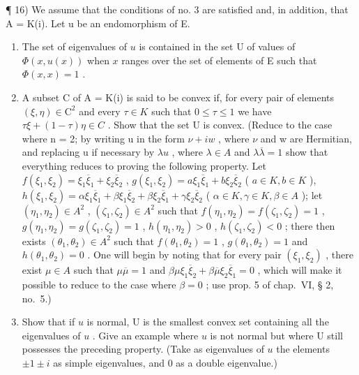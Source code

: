 ¶ 16) We assume that the conditions of no. 3 are satisfied and, in addition, that A = K(i). Let u be an endomorphism of E.

\begin{enumerate}
\def\labelenumi{\alph{enumi})}
\item
  The set of eigenvalues of \(u\) is contained in the set U of values of \(\Phi(x, u(x))\) when \(x\) ranges over the set of elements of E such that \(\Phi(x, x) = 1\) .
\item
  A subset C of A = K(i) is said to be convex if, for every pair of elements \((\xi, \eta) \in \mathrm{C}^{2}\) and every \(\tau \in K\) such that \(0 \leqslant \tau \leqslant 1\) we have \(\tau\xi + (1 - \tau)\eta \in C\) . Show that the set U is convex. (Reduce to the case where n = 2; by writing u in the form \(\nu + iw\) , where \(\nu\) and w are Hermitian, and replacing u if necessary by \(\lambda u\) , where \(\lambda \in A\) and \(\lambda\overline{\lambda} = 1\) show that everything reduces to proving the following property. Let \(f(\xi_{1}, \xi_{2}) = \xi_{1}\overline{\xi}_{1} + \xi_{2}\overline{\xi}_{2}\) , \(g(\xi_{1}, \xi_{2}) = a\xi_{1}\overline{\xi}_{1} + b\xi_{2}\overline{\xi}_{2}\) ( \(a \in K, b \in K\) ), \(h(\xi_{1}, \xi_{2}) = \alpha\xi_{1}\overline{\xi}_{1} + \beta\xi_{1}\overline{\xi}_{2} + \beta\xi_{2}\overline{\xi}_{1} + \gamma\xi_{2}\overline{\xi}_{2}\) ( \(\alpha \in K, \gamma \in K, \beta \in A\) ); let \((\eta_{1}, \eta_{2}) \in A^{2}\) , \((\zeta_{1}, \zeta_{2}) \in A^{2}\) such that \(f(\eta_{1}, \eta_{2}) = f(\zeta_{1}, \zeta_{2}) = 1\) , \(g(\eta_{1}, \eta_{2}) = g(\zeta_{1}, \zeta_{2}) = 1\) , \(h(\eta_{1}, \eta_{2}) > 0\) , \(h(\zeta_{1}, \zeta_{2}) < 0\) ; there then exists \((\theta_{1}, \theta_{2}) \in A^{2}\) such that \(f(\theta_{1}, \theta_{2}) = 1\) , \(g(\theta_{1}, \theta_{2}) = 1\) and \(h(\theta_{1}, \theta_{2}) = 0\) . One will begin by noting that for every pair \((\xi_{1}, \xi_{2})\) , there exist \(\mu \in A\) such that \(\mu\overline{\mu} = 1\) and \(\beta\mu\xi_{1}\overline{\xi}_{2} + \beta\overline{\mu}\xi_{2}\overline{\xi}_{1} = 0\) , which will make it possible to reduce to the case where \(\beta = 0\) ; use prop. 5 of chap.~VI, § 2, no.~5.)
\item
  Show that if \(u\) is normal, U is the smallest convex set containing all the eigenvalues of \(u\) . Give an example where \(u\) is not normal but where U still possesses the preceding property. (Take as eigenvalues of \(u\) the elements \(\pm 1 \pm i\) as simple eigenvalues, and 0 as a double eigenvalue.)
\end{enumerate}

